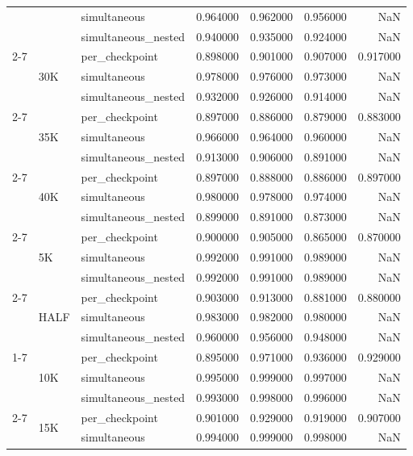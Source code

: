 \begin{tabular}{lllrrrr}
 &  & simultaneous & 0.964000 & 0.962000 & 0.956000 & NaN \\
 &  & simultaneous\_nested & 0.940000 & 0.935000 & 0.924000 & NaN \\
\cline{2-7}
 & \multirow[t]{3}{*}{30K} & per\_checkpoint & 0.898000 & 0.901000 & 0.907000 & 0.917000 \\
 &  & simultaneous & 0.978000 & 0.976000 & 0.973000 & NaN \\
 &  & simultaneous\_nested & 0.932000 & 0.926000 & 0.914000 & NaN \\
\cline{2-7}
 & \multirow[t]{3}{*}{35K} & per\_checkpoint & 0.897000 & 0.886000 & 0.879000 & 0.883000 \\
 &  & simultaneous & 0.966000 & 0.964000 & 0.960000 & NaN \\
 &  & simultaneous\_nested & 0.913000 & 0.906000 & 0.891000 & NaN \\
\cline{2-7}
 & \multirow[t]{3}{*}{40K} & per\_checkpoint & 0.897000 & 0.888000 & 0.886000 & 0.897000 \\
 &  & simultaneous & 0.980000 & 0.978000 & 0.974000 & NaN \\
 &  & simultaneous\_nested & 0.899000 & 0.891000 & 0.873000 & NaN \\
\cline{2-7}
 & \multirow[t]{3}{*}{5K} & per\_checkpoint & 0.900000 & 0.905000 & 0.865000 & 0.870000 \\
 &  & simultaneous & 0.992000 & 0.991000 & 0.989000 & NaN \\
 &  & simultaneous\_nested & 0.992000 & 0.991000 & 0.989000 & NaN \\
\cline{2-7}
 & \multirow[t]{3}{*}{HALF} & per\_checkpoint & 0.903000 & 0.913000 & 0.881000 & 0.880000 \\
 &  & simultaneous & 0.983000 & 0.982000 & 0.980000 & NaN \\
 &  & simultaneous\_nested & 0.960000 & 0.956000 & 0.948000 & NaN \\
\cline{1-7} \cline{2-7}
\multirow[t]{27}{*}{NewYork} & \multirow[t]{3}{*}{10K} & per\_checkpoint & 0.895000 & 0.971000 & 0.936000 & 0.929000 \\
 &  & simultaneous & 0.995000 & 0.999000 & 0.997000 & NaN \\
 &  & simultaneous\_nested & 0.993000 & 0.998000 & 0.996000 & NaN \\
\cline{2-7}
 & \multirow[t]{3}{*}{15K} & per\_checkpoint & 0.901000 & 0.929000 & 0.919000 & 0.907000 \\
 &  & simultaneous & 0.994000 & 0.999000 & 0.998000 & NaN \\

\end{tabular}
